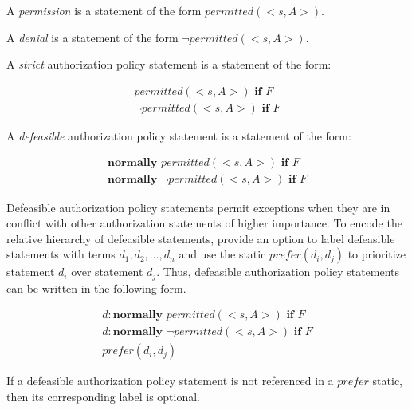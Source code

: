 \begin{definition}
    A \textit{permission} is a statement of the form $permitted(<s,A>)$.
\end{definition}

\begin{definition}
    A \textit{denial} is a statement of the form $\neg permitted(<s,A>)$.
\end{definition}

\begin{definition}
    A \textit{strict} authorization policy statement is a statement of the form:

    \begin{gather*}
        permitted\left(<s,A>\right) \textbf{ if } F \\
        \neg permitted\left(<s,A>\right) \textbf{ if } F
    \end{gather*}
\end{definition}

\begin{definition}
    A \textit{defeasible} authorization policy statement is a statement of the form:

    \begin{gather*}
        \textbf{normally } permitted(<s,A>) \textbf{ if } F \\
        \textbf{normally } \neg permitted(<s,A>) \textbf{ if } F
    \end{gather*}
\end{definition}

Defeasible authorization policy statements permit exceptions when they are in conflict with other authorization statements of higher importance.
To encode the relative hierarchy of defeasible statements, \citet{gelfond_authorization_2008} provide an option to label defeasible statements with terms $d_1,d_2,\ldots,d_n$ and use the static $prefer\left(d_i,d_j\right)$ to prioritize statement $d_i$ over statement $d_j$.
Thus, defeasible authorization policy statements can be written in the following form.

\begin{gather*}
    d: \textbf{normally } permitted(<s,A>) \textbf{ if } F \\
    d: \textbf{normally } \neg permitted(<s,A>) \textbf{ if } F \\
    prefer(d_i, d_j)
\end{gather*}

If a defeasible authorization policy statement is not referenced in a $prefer$ static, then its corresponding label is optional.

